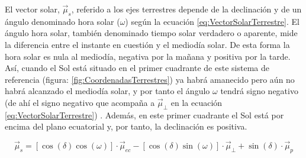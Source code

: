 El vector solar, $\vec{\mu}_{s}$, referido a los ejes terrestres
depende de la declinación y de un ángulo denominado hora solar ($\omega$)
según la ecuación \ref{eq:VectorSolarTerrestre}. El ángulo hora solar,
también denominado tiempo solar verdadero o aparente, mide la diferencia
entre el instante en cuestión y el mediodía solar. De esta forma la
hora solar es nula al mediodía, negativa por la mañana y positiva
por la tarde. Así, cuando el Sol está situado en el primer cuadrante
de este sistema de referencia (figura: \ref{fig:CoordenadasTerrestres})
ya habrá amanecido pero aún no habrá alcanzado el mediodía solar,
y por tanto el ángulo $\omega$ tendrá signo negativo (de ahí el signo
negativo que acompaña a $\vec{\mu}_{\bot}$ en la ecuación \ref{eq:VectorSolarTerrestre})
. Además, en este primer cuadrante el Sol está por encima del plano
ecuatorial y, por tanto, la declinación es positiva.

\begin{equation}
\vec{\mu}_{s}=\left[\cos\left(\delta\right)\cos\left(\omega\right)\right]\cdot\vec{\mu}_{ec}-\left[\cos\left(\delta\right)\sin\left(\omega\right)\right]\cdot\vec{\mu}_{\bot}+\sin\left(\delta\right)\cdot\vec{\mu}_{p}\label{eq:VectorSolarTerrestre}\end{equation}


